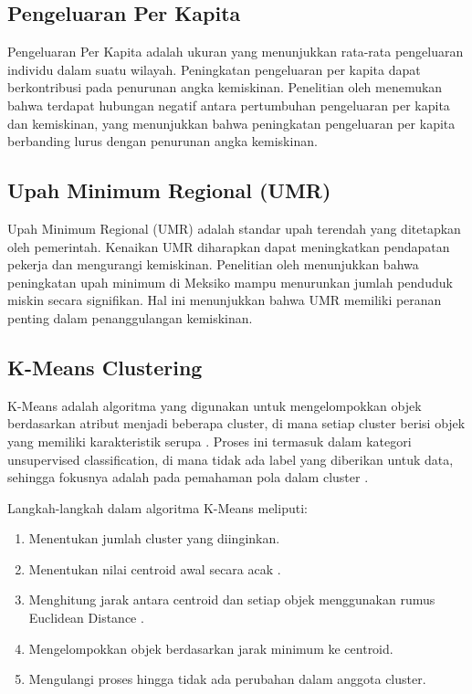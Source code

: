 \documentclass{article}
\begin{document}
\subsection{Pengeluaran Per Kapita}

Pengeluaran Per Kapita adalah ukuran yang menunjukkan rata-rata pengeluaran individu dalam suatu wilayah. Peningkatan pengeluaran per kapita dapat berkontribusi pada penurunan angka kemiskinan. Penelitian oleh \cite{muttaqin2025elastisitas} menemukan bahwa terdapat hubungan negatif antara pertumbuhan pengeluaran per kapita dan kemiskinan, yang menunjukkan bahwa peningkatan pengeluaran per kapita berbanding lurus dengan penurunan angka kemiskinan.

\subsection{Upah Minimum Regional (UMR)}

Upah Minimum Regional (UMR) adalah standar upah terendah yang ditetapkan oleh pemerintah. Kenaikan UMR diharapkan dapat meningkatkan pendapatan pekerja dan mengurangi kemiskinan. Penelitian oleh \cite{munguia2024minimum} menunjukkan bahwa peningkatan upah minimum di Meksiko mampu menurunkan jumlah penduduk miskin secara signifikan. Hal ini menunjukkan bahwa UMR memiliki peranan penting dalam penanggulangan kemiskinan.



\subsection{K-Means Clustering}
K-Means adalah algoritma yang digunakan untuk mengelompokkan objek berdasarkan atribut menjadi beberapa cluster, di mana setiap cluster berisi objek yang memiliki karakteristik serupa . Proses ini termasuk dalam kategori unsupervised classification, di mana tidak ada label yang diberikan untuk data, sehingga fokusnya adalah pada pemahaman pola dalam cluster .

Langkah-langkah dalam algoritma K-Means meliputi:

\begin{enumerate}
   \item Menentukan jumlah cluster yang diinginkan.

   \item Menentukan nilai centroid awal secara acak .

   \item Menghitung jarak antara centroid dan setiap objek menggunakan rumus Euclidean Distance .

    \item Mengelompokkan objek berdasarkan jarak minimum ke centroid.

    \item Mengulangi proses hingga tidak ada perubahan dalam anggota cluster.

\end{enumerate}
   
\end{document}

